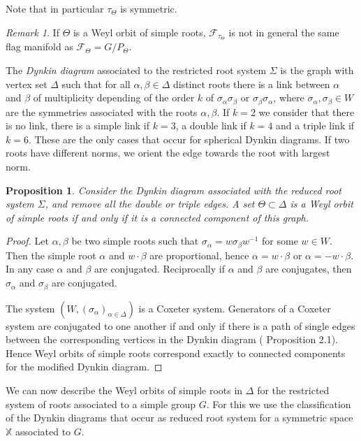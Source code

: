 \documentclass[reqno,10pt]{amsart}
\theoremstyle{plain}
\newtheorem{prop}[thm]{Proposition}
\theoremstyle{definition}
\theoremstyle{remark}
\newtheorem{rem}[thm]{Remark}
\newcommand{\type}{\tau}
\newcommand{\X}{\mathbb{X}}
\begin{document}
Note that in particular $\type_\Theta$ is symmetric.

\begin{rem}
If $\Theta$ is a Weyl orbit of simple roots, $\mathcal{F}_{\type_\Theta}$ is not in general the same flag manifold as $\mathcal{F}_\Theta=G/P_\Theta$.
\end{rem}

The \emph{Dynkin diagram} associated to the restricted root system $\Sigma$ is the graph with vertex set $\Delta$ such that for all $\alpha,\beta\in \Delta$ distinct roots there is a link between $\alpha$ and $\beta$ of multiplicity depending of the order $k$ of $\sigma_\alpha \sigma_\beta$ or $\sigma_\beta \sigma_\alpha$, where $\sigma_\alpha,\sigma_\beta\in W$ are the symmetries associated with the roots $\alpha, \beta$. If $k=2$ we consider that there is no link, there is a simple link if $k=3$, a double link if $k=4$ and a triple link if $k=6$. These are the only cases that occur for spherical Dynkin diagrams. If two roots have different norms, we orient the edge towards the root with largest norm. 

\begin{prop}
Consider the Dynkin diagram associated with the reduced root system $\Sigma$, and remove all the double or triple edges. A set $\Theta\subset \Delta$ is a Weyl orbit of simple roots if and only if it is a connected component of this graph.
\end{prop}

\begin{proof}

Let $\alpha,\beta$ be two simple roots such that $\sigma_\alpha=w\sigma_\beta w^{-1}$ for some $w\in W$. Then the simple root $\alpha$ and $w\cdot \beta$ are proportional, hence $\alpha=w\cdot \beta$ or $\alpha=-w\cdot \beta$. In any case $\alpha$ and $\beta$ are conjugated. Reciprocally if $\alpha$ and $\beta$ are conjugates, then $\sigma_\alpha$ and $\sigma_\beta$ are conjugated.

\medskip

The system $(W, (\sigma_\alpha)_{\alpha\in \Delta})$ is a Coxeter system. Generators of a Coxeter system are conjugated to one another if and only if there is a path of single edges between the corresponding vertices in the Dynkin diagram (\cite{Coxeter} Proposition 2.1). Hence Weyl orbits of simple roots correspond exactly to connected components for the modified Dynkin diagram.\end{proof}

We can now describe the Weyl orbits of simple roots in $\Delta$ for the restricted system of roots associated to a simple group $G$. For this we use the classification of the Dynkin diagrams that occur as reduced root system for a symmetric space $\X$ associated to $G$.
\end{document}
